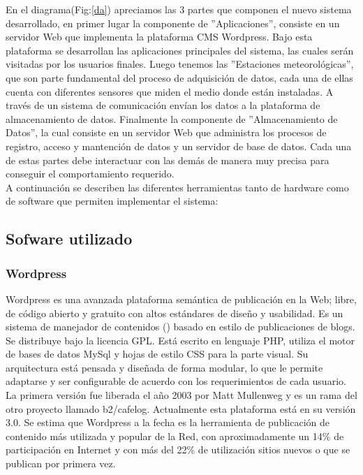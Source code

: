 En el diagrama(Fig:\ref{da}) apreciamos las 3 partes que componen el nuevo sistema desarrollado, en primer lugar la componente de ''Aplicaciones'', consiste en un servidor Web que implementa la plataforma CMS Wordpress. Bajo esta plataforma se desarrollan las aplicaciones principales del sistema, las cuales serán visitadas por los usuarios finales. Luego tenemos las ''Estaciones meteorológicas'', que son parte fundamental del proceso de adquisición de datos, cada una de ellas cuenta con diferentes sensores que miden el medio donde están instaladas. A través de un sistema de comunicación envían los datos a la plataforma de almacenamiento de datos. Finalmente la componente de ''Almacenamiento de Datos'', la cual consiste en un servidor Web que administra los procesos de registro, acceso y mantención de datos y un servidor de base de datos. Cada una de estas partes debe interactuar con las demás de manera muy precisa para conseguir el comportamiento requerido.\\

A continuación se describen las diferentes herramientas tanto de hardware como de software que permiten implementar el sistema:

\subsection{Sofware utilizado}
\subsubsection{Wordpress}
Wordpress es una avanzada plataforma semántica de publicación en la Web; libre, de código abierto y gratuito con altos estándares de diseño y usabilidad. Es un sistema de manejador de contenidos () basado en estilo de publicaciones de blogs. Se distribuye bajo la licencia GPL. Está escrito en lenguaje PHP, utiliza el motor de bases de datos MySql y hojas de estilo CSS para la parte visual. Su arquitectura está pensada y diseñada de forma modular, lo que le permite adaptarse y ser configurable de acuerdo con los requerimientos de cada usuario.\\

La primera versión fue liberada el año 2003 por Matt Mullenweg y es un rama del otro proyecto llamado b2/cafelog. Actualmente esta plataforma está en su versión 3.0. Se estima que Wordpress a la fecha es la herramienta de publicación de contenido más utilizada y popular de la Red, con aproximadamente un 14\% de participación en Internet y con más del 22\% de utilización sitios nuevos o que se publican por primera vez\cite{software:usoWordpress}.

